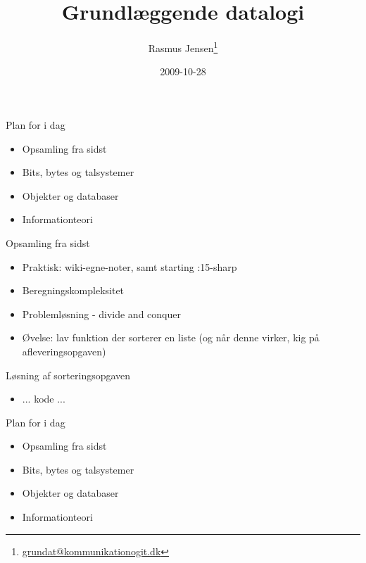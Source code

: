 \documentclass[a4paper,landscape]{slides}
\title{Grundlæggende datalogi}
\author{Rasmus Jensen\footnote{\url{grundat@kommunikationogit.dk}}}
\date{2009-10-28}
\begin{document}
\maketitle
\begin{slide}\begin{center} {\large Plan for i dag } \end{center} \begin{itemize} \addtolength{\itemsep}{-\baselineskip}
    \item  Opsamling fra sidst
    \item  Bits, bytes og talsystemer
    \item  Objekter og databaser
    \item  Informationteori
\end{itemize} \end{slide} 
\begin{slide}\begin{center} {\large Opsamling fra sidst } \end{center} \begin{itemize} \addtolength{\itemsep}{-\baselineskip}
    \item  Praktisk: wiki-egne-noter, samt starting :15-sharp
    \item  Beregningskompleksitet
    \item  Problemløsning - divide and conquer
    \item  Øvelse: lav funktion der sorterer en liste (og når denne virker, kig på afleveringsopgaven)
\end{itemize} \end{slide} \begin{slide}\begin{center} {\large Løsning af sorteringsopgaven } \end{center} \begin{itemize} \addtolength{\itemsep}{-\baselineskip}
\item ... kode ...
\end{itemize} \end{slide} \begin{slide}\begin{center} {\large Plan for i dag } \end{center} \begin{itemize} \addtolength{\itemsep}{-\baselineskip} \item  Opsamling fra sidst \item  Bits, bytes og talsystemer \item  Objekter og databaser \item  Informationteori

\end{itemize}
\end{slide}
\end{document}
